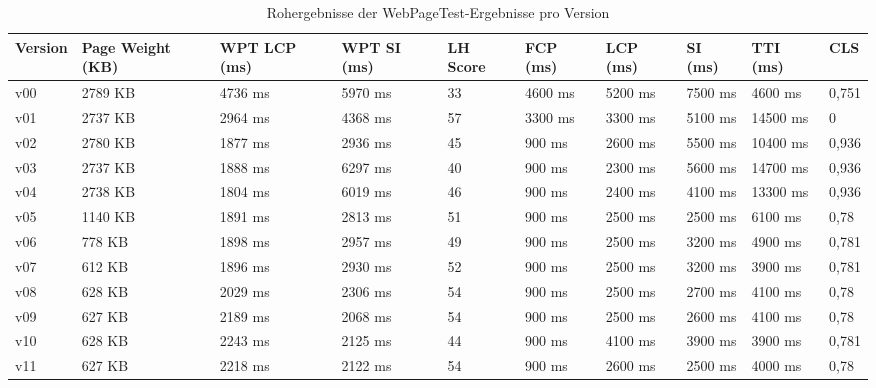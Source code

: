 \documentclass[11pt,a4paper]{article}
\begin{document}
\begin{landscape}
\begin{table}[h]
  \begin{tabular}{|l|l|l|l|l|l|l|l|l|l|}
    \hline
    Version & Page Weight (KB) & WPT LCP (ms) & WPT SI (ms) & LH Score & FCP (ms) & LCP (ms) & SI (ms) & TTI (ms) & CLS \\
    \hline
    v00 & 2789 KB & 4736 ms & 5970 ms & 33 & 4600 ms & 5200 ms & 7500 ms & 4600 ms & 0,751 \\
    \hline
    v01 & 2737 KB & 2964 ms & 4368 ms & 57 & 3300 ms & 3300 ms & 5100 ms & 14500 ms & 0 \\ %
    \hline
    v02 & 2780 KB & 1877 ms & 2936 ms & 45 & 900 ms & 2600 ms & 5500 ms & 10400 ms & 0,936 \\
    \hline
    v03 & 2737 KB & 1888 ms & 6297 ms & 40 & 900 ms & 2300 ms & 5600 ms & 14700 ms & 0,936 \\
    \hline
    v04 & 2738 KB & 1804 ms & 6019 ms & 46 & 900 ms & 2400 ms & 4100 ms & 13300 ms & 0,936 \\
    \hline
    v05 & 1140 KB & 1891 ms & 2813 ms & 51 & 900 ms & 2500 ms & 2500 ms & 6100 ms & 0,78 \\
    \hline
    v06 & 778 KB & 1898 ms & 2957 ms & 49 & 900 ms & 2500 ms & 3200 ms & 4900 ms & 0,781 \\
    \hline
    v07 & 612 KB & 1896 ms & 2930 ms & 52 & 900 ms & 2500 ms & 3200 ms & 3900 ms & 0,781 \\
    \hline
    v08 & 628 KB & 2029 ms & 2306 ms & 54 & 900 ms & 2500 ms & 2700 ms & 4100 ms & 0,78 \\
    \hline
    v09 & 627 KB & 2189 ms & 2068 ms & 54 & 900 ms & 2500 ms & 2600 ms & 4100 ms & 0,78 \\
    \hline
    v10 & 628 KB & 2243 ms & 2125 ms & 44 & 900 ms & 4100 ms & 3900 ms & 3900 ms & 0,781 \\ %
    \hline
    v11 & 627 KB & 2218 ms & 2122 ms & 54 & 900 ms & 2600 ms & 2500 ms & 4000 ms & 0,78 \\
    \hline
  \end{tabular}
  \caption{Rohergebnisse der WebPageTest-Ergebnisse pro Version}\label{tab:versionen}
\end{table}
\end{landscape}
  
\end{document}
